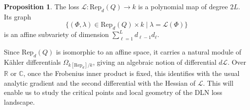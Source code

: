 \documentclass{article}
\theoremstyle{definition}
\newtheorem{proposition}[theorem]{Proposition}
\begin{document}
\begin{proposition}
The loss $\mathcal{L} : \mathrm{Rep}_d(Q) \to k$ is a polynomial map of degree $2L$.  
Its graph
\[
    \{ (\Phi, \lambda) \in \mathrm{Rep}_d(Q) \times k \mid \lambda = \mathcal{L}(\Phi) \}
\]
is an affine subvariety of dimension $\sum_{\ell=1}^L d_{\ell-1} d_\ell$.
\end{proposition}

Since $\mathrm{Rep}_d(Q)$ is isomorphic to an affine space, it carries a natural module of Kähler differentials $\Omega_{k[\mathrm{Rep}_d]/k}$, giving an algebraic notion of differential $d\mathcal{L}$.  
Over $\mathbb{R}$ or $\mathbb{C}$, once the Frobenius inner product is fixed, this identifies with the usual analytic gradient and the second differential with the Hessian of $\mathcal{L}$.  
This will enable us to study the critical points and local geometry of the DLN loss landscape.
\end{document}
